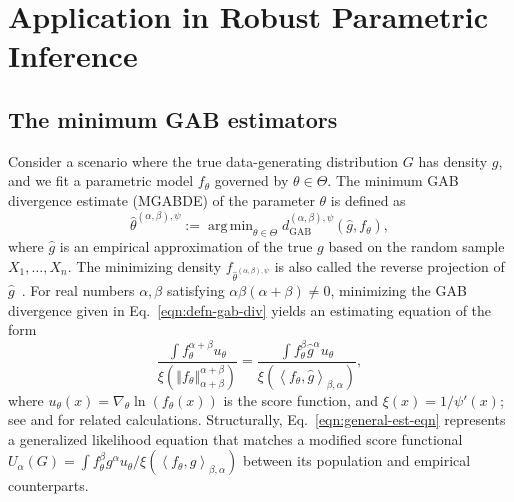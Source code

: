 \documentclass[11pt]{article}
\theoremstyle{plain}
\theoremstyle{remark}
\newcommand{\dGAB}{d_{\mathrm{GAB}}}
\newcommand{\norm}[1]{\left\Vert #1 \right\Vert}
\newcommand{\inner}[1]{\left\langle #1\right\rangle}
\DeclareMathOperator*{\argmin}{arg\,min}
\begin{document}
\section{Application in Robust Parametric Inference}\label{sec:robust-parametric-inference}

\subsection{The minimum GAB estimators}\label{sec:min-gab-est}

Consider a scenario where the true data-generating distribution $G$ has density $g$, and we fit a parametric model $f_\theta$ governed by $\theta \in \Theta$. The minimum GAB divergence estimate (MGABDE) of the parameter $\theta$ is defined as
\begin{equation*}
    \hat{\theta}^{(\alpha,\beta), \psi} := \argmin_{\theta \in \Theta} \dGAB^{(\alpha,\beta), \psi}(\hat{g}, f_\theta),
\end{equation*}
\noindent where $\hat{g}$ is an empirical approximation of the true $g$ based on the random sample $X_1, \dots, X_n$. The minimizing density $f_{\hat{\theta}^{(\alpha,\beta),\psi}}$ is also called the reverse projection of $\hat{g}$~\citep{gayen2021projection}. For real numbers $\alpha, \beta$ satisfying $\alpha\beta(\alpha+\beta) \neq 0$, minimizing the GAB divergence given in Eq.~\eqref{eqn:defn-gab-div} yields an estimating equation of the form
\begin{equation}
    \frac{\int f_\theta^{\alpha+\beta} u_\theta}{\xi(\norm{f_\theta}_{\alpha+\beta}^{\alpha+\beta}) } = \frac{\int f_{\theta}^\beta \hat{g}^\alpha u_\theta }{\xi(\inner{f_\theta, \hat{g}}_{\beta,\alpha})},
    \label{eqn:general-est-eqn}
\end{equation}
\noindent where $u_\theta(x) = \nabla_\theta \ln(f_\theta(x))$ is the score function,
and $\xi(x) = 1/\psi'(x)$; see \cite{windham1995robustifying} and \cite{jones2001comparison} for related calculations. Structurally, Eq.~\eqref{eqn:general-est-eqn} represents a generalized likelihood equation that matches a modified score functional $U_\alpha(G) = \int f_\theta^\beta g^\alpha u_\theta / \xi(\inner{f_\theta, g}_{\beta,\alpha})$ between its population and empirical counterparts.
\end{document}
